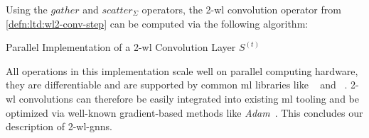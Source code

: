 Using the $\mathit{gather}$ and $\mathit{scatter}_{\Sigma}$ operators, the 2-\acs{wl} convolution operator from \cref{defn:ltd:wl2-conv-step} can be computed via the following algorithm:
\begin{algorithm}[H]
	\caption{Parallel Implementation of a 2-\acs{wl} Convolution Layer $S^{(t)}$}\label{algo:ltd:wl2-conv}
	\begin{algorithmic}[1]
		\EndFunction{}
	\end{algorithmic}
\end{algorithm}
All operations in this implementation scale well on parallel computing hardware, they are differentiable and are supported by common \ac{ml} libraries like ~\cite{Abadi2015}\cite{TF} and ~\cite{Paszke2019}\cite{PyT}.
2-\acs{wl} convolutions can therefore be easily integrated into existing \ac{ml} tooling and be optimized via well-known gradient-based methods like \textit{Adam}~\cite{Kingma2015}.
This concludes our description of 2-\acs{wl}-\acsp{gnn}.
